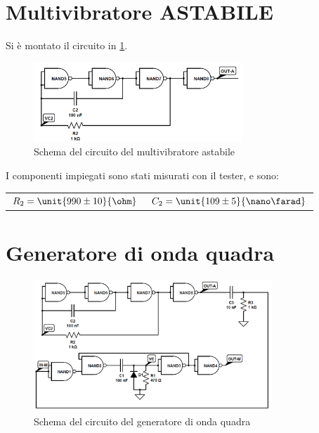 \documentclass[a4paper,10pt]{article}
\begin{document}
\section{Multivibratore ASTABILE}

Si è montato il circuito in \cref{fig:AST}.

\begin{figure}[H]
	\centering
	\includegraphics[width=0.7\textwidth]{../grafici/Astabile.png}
	\caption{Schema del circuito del multivibratore astabile}
	\label{fig:AST}
\end{figure}

I componenti impiegati sono stati misurati con il tester, e sono:

\begin{table}[H]
	\centering
	\begin{tabular}{cc}
		$R_2 = \unit{990 \pm 10}{\ohm}$ & $C_2 = \unit{109 \pm 5}{\nano\farad}$\\
	\end{tabular}
\end{table}


\section{Generatore di onda quadra}

\begin{figure}[H]
	\centering
	\includegraphics[width=0.8\textwidth]{../grafici/SqGen.png}
	\caption{Schema del circuito del generatore di onda quadra}
	\label{fig:SQGEN}
\end{figure}
\end{document}
